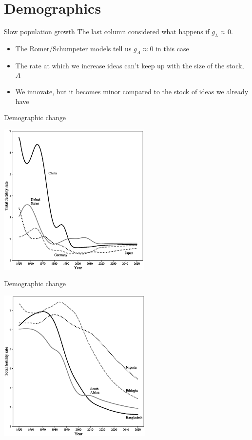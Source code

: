 \section{Demographics}
\begin{frame}{Slow population growth}
The last column considered what happens if $g_L \approx 0$.
\begin{itemize}
	\item The Romer/Schumpeter models tell us $g_A \approx 0$ in this case
	\item The rate at which we increase ideas can't keep up with the size of the stock, $A$
	\item We innovate, but it becomes minor compared to the stock of ideas we already have
\end{itemize}
\end{frame}

\begin{frame}{Demographic change}
\begin{center}
\includegraphics[height=3in]{../Figures/fig-ch12-fig1.eps}
\end{center}
\end{frame}

\begin{frame}{Demographic change}
\begin{center}
\includegraphics[height=3in]{../Figures/fig-ch12-fig2.eps}
\end{center}
\end{frame}


